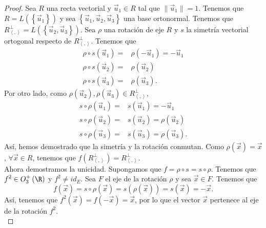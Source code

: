 \begin{proof}
	Sea $\displaystyle R $ una recta vectorial y $\displaystyle \vec{u}_{1} \in R $ tal que $\displaystyle \|\vec{u}_{1}\| = 1 $. Tenemos que $\displaystyle R = L\left( \left\{ \vec{u}_{1}\right\} \right) $ y sea $\displaystyle \left\{ \vec{u}_{1}, \vec{u}_{2}, \vec{u}_{3}\right\}  $ una base ortonormal. Tenemos que $\displaystyle R^{\perp }_{\left\langle ,  \right\rangle } = L\left( \left\{ \vec{u}_{2}, \vec{u}_{3}\right\} \right) $.
Sea $\displaystyle \rho $ una rotación de eje $\displaystyle R $ y $\displaystyle s $ la simetría vectorial ortogonal respecto de $\displaystyle R^{\perp }_{\left\langle ,  \right\rangle } $. Tenemos que 
\[
\begin{split}
	\rho\circ s\left(\vec{u}_{1}\right) = & \rho\left(-\vec{u}_{1}\right) = -\vec{u}_{1} \\
	\rho\circ s\left(\vec{u}_{2}\right)= & \rho\left(\vec{u}_{2}\right) \\
	\rho\circ s\left(\vec{u}_{3}\right) = & \rho\left(\vec{u}_{3}\right).
\end{split}
\]
Por otro lado, como $\displaystyle \rho\left(\vec{u}_{2}\right), \rho\left(\vec{u}_{3}\right)\in R^{\perp }_{\left\langle ,  \right\rangle } $,
\[
\begin{split}
	s \circ \rho\left(\vec{u}_{1}\right) = & s\left(\vec{u}_{1}\right) = -\vec{u}_{1} \\
	s\circ \rho\left(\vec{u}_{2}\right) = & s\left(\vec{u}_{2}\right) = \rho\left(\vec{u}_{2}\right) \\
	s\circ\rho\left(\vec{u}_{3}\right) = & s\left(\vec{u}_{3}\right) = \rho\left(\vec{u}_{3}\right).
\end{split}
\]
Así, hemos demostrado que la simetría y la rotación conmutan. Como $\displaystyle \rho\left(\vec{x}\right) = \vec{x} $, $\displaystyle \forall \vec{x} \in R $, tenemos que $\displaystyle f\left(R^{\perp }_{\left\langle ,  \right\rangle }\right) = R^{\perp }_{\left\langle ,  \right\rangle } $. \\
Ahora demostramos la unicidad. Supongamos que $\displaystyle f = \rho\circ s = s\circ \rho $. Tenemos que $\displaystyle f^{2} \in O_{3}^{+}\left(\R\right) $ y $\displaystyle f^{2} \neq id _{E} $. Sea $\displaystyle F $ el eje de la rotación $\displaystyle \rho $ y sea $\displaystyle \vec{x} \in F $. Tenemos que
\[f\left(\vec{x}\right) = s\circ\rho\left(\vec{x}\right) = s\left(\rho\left(\vec{x}\right)\right) = s\left(\vec{x}\right) = -\vec{x} .\]
Así, tenemos que $\displaystyle f^{2}\left(\vec{x}\right)=f\left(-\vec{x}\right)=\vec{x} $, por lo que el vector $\displaystyle \vec{x} $ pertenece al eje de la rotación $\displaystyle f^{2} $. \\

\end{proof}
